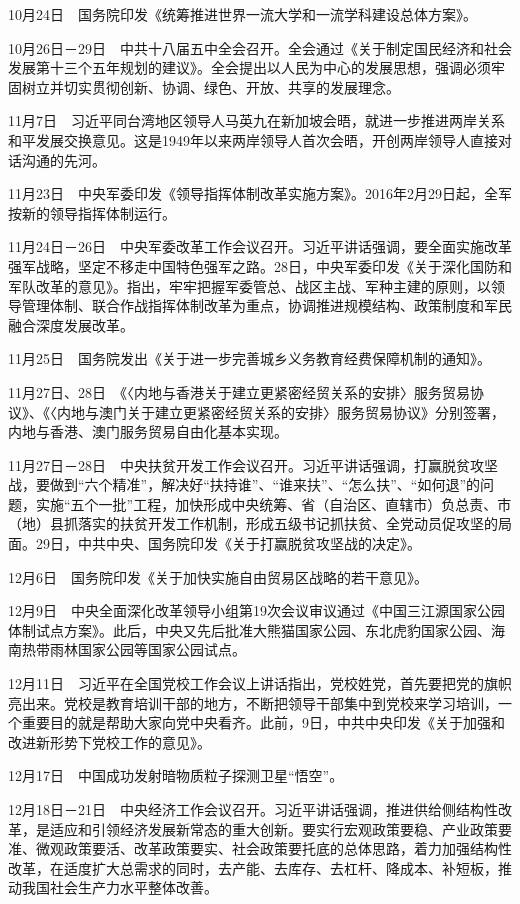 \documentclass[10pt,a4paper,twocolumn]{book}
\begin{document}
10月24日　国务院印发《统筹推进世界一流大学和一流学科建设总体方案》。

10月26日－29日　中共十八届五中全会召开。全会通过《关于制定国民经济和社会发展第十三个五年规划的建议》。全会提出以人民为中心的发展思想，强调必须牢固树立并切实贯彻创新、协调、绿色、开放、共享的发展理念。

11月7日　习近平同台湾地区领导人马英九在新加坡会晤，就进一步推进两岸关系和平发展交换意见。这是1949年以来两岸领导人首次会晤，开创两岸领导人直接对话沟通的先河。

11月23日　中央军委印发《领导指挥体制改革实施方案》。2016年2月29日起，全军按新的领导指挥体制运行。

11月24日－26日　中央军委改革工作会议召开。习近平讲话强调，要全面实施改革强军战略，坚定不移走中国特色强军之路。28日，中央军委印发《关于深化国防和军队改革的意见》。指出，牢牢把握军委管总、战区主战、军种主建的原则，以领导管理体制、联合作战指挥体制改革为重点，协调推进规模结构、政策制度和军民融合深度发展改革。

11月25日　国务院发出《关于进一步完善城乡义务教育经费保障机制的通知》。

11月27日、28日　《〈内地与香港关于建立更紧密经贸关系的安排〉服务贸易协议》、《〈内地与澳门关于建立更紧密经贸关系的安排〉服务贸易协议》分别签署，内地与香港、澳门服务贸易自由化基本实现。

11月27日－28日　中央扶贫开发工作会议召开。习近平讲话强调，打赢脱贫攻坚战，要做到“六个精准”，解决好“扶持谁”、“谁来扶”、“怎么扶”、“如何退”的问题，实施“五个一批”工程，加快形成中央统筹、省（自治区、直辖市）负总责、市（地）县抓落实的扶贫开发工作机制，形成五级书记抓扶贫、全党动员促攻坚的局面。29日，中共中央、国务院印发《关于打赢脱贫攻坚战的决定》。

12月6日　国务院印发《关于加快实施自由贸易区战略的若干意见》。

12月9日　中央全面深化改革领导小组第19次会议审议通过《中国三江源国家公园体制试点方案》。此后，中央又先后批准大熊猫国家公园、东北虎豹国家公园、海南热带雨林国家公园等国家公园试点。

12月11日　习近平在全国党校工作会议上讲话指出，党校姓党，首先要把党的旗帜亮出来。党校是教育培训干部的地方，不断把领导干部集中到党校来学习培训，一个重要目的就是帮助大家向党中央看齐。此前，9日，中共中央印发《关于加强和改进新形势下党校工作的意见》。

12月17日　中国成功发射暗物质粒子探测卫星“悟空”。

12月18日－21日　中央经济工作会议召开。习近平讲话强调，推进供给侧结构性改革，是适应和引领经济发展新常态的重大创新。要实行宏观政策要稳、产业政策要准、微观政策要活、改革政策要实、社会政策要托底的总体思路，着力加强结构性改革，在适度扩大总需求的同时，去产能、去库存、去杠杆、降成本、补短板，推动我国社会生产力水平整体改善。
\end{document}
